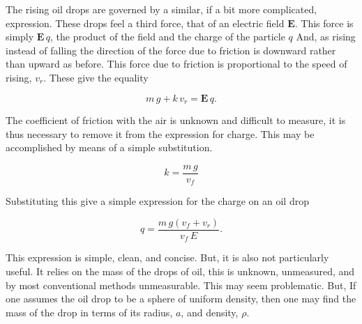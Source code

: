 \documentclass[]{article}
\begin{document}
The rising oil drops are governed by a similar, if a bit more complicated, expression. These drops feel a third force, that of an electric field \( \mathbf{E} \). This force is simply \(\mathbf{E} \, q\), the product of the field and the charge of the particle \(q\) And, as rising instead of falling the direction of the force due to friction is downward rather than upward as before. This force due to friction is proportional to the speed of rising, \( v_r\). These give the equality

\begin{equation}
m \, g + k \, v_r = \mathbf{E} \, q.
\end{equation}

The coefficient of friction with the air is unknown and difficult to measure, it is thus necessary to remove it from the expression for charge. This may be accomplished by means of a simple substitution.

\begin{equation}
k = \frac{m \, g}{v_f} 
\end{equation}

Substituting this give a simple expression for the charge on an oil drop

\begin{equation}
q={\frac {m \, g \left( v_{f} + v_{r} \right) }{v_{f} \, E}}.
\end{equation}

This expression is simple, clean, and concise. But, it is also not particularly useful. It relies on the mass of the drops of oil, this is unknown, unmeasured, and by most conventional methods unmeasurable. This may seem problematic. But, If one assumes the oil drop to be a sphere of uniform density, then one may find the mass of the drop in terms of its radius, \(a\), and density, \(\rho\).
\end{document}

